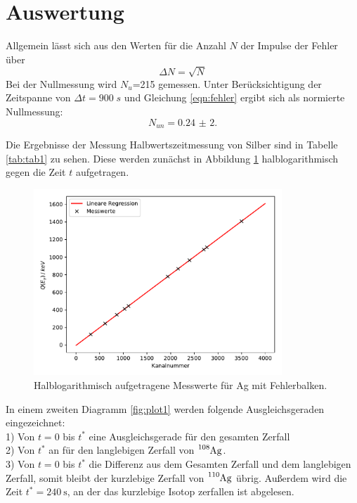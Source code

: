 \section{Auswertung}
\label{sec:Auswertung}
Allgemein lässt sich aus den Werten für die Anzahl $N$ der Impulse der Fehler
über
\begin{equation}
  \Delta N= \sqrt{N}
  \label{eqn:fehler}
\end{equation}
Bei der Nullmessung wird $N_u$=215 gemessen. Unter Berücksichtigung der Zeitspanne von
$\Delta t=900\;s$ und Gleichung \ref{eqn:fehler} ergibt sich als normierte Nullmessung:
\begin{equation}
  N_{un}=\SI{0,24(2)}.
\end{equation}

Die Ergebnisse der Messung Halbwertszeitmessung von Silber sind in Tabelle
\ref{tab:tab1} zu sehen. Diese werden zunächst in Abbildung \ref{fig:plot3}
halblogarithmisch gegen die Zeit $t$ aufgetragen.



\begin{figure}[H]
  \centering
  \includegraphics[height=7cm]{plot3.pdf}
  \caption{Halblogarithmisch aufgetragene Messwerte für Ag mit Fehlerbalken.}
  \label{fig:plot3}
\end{figure}

In einem zweiten Diagramm \ref{fig:plot1} werden folgende Ausgleichsgeraden eingezeichnet:\\
1) Von $t=0$ bis $t^{*}$ eine Ausgleichsgerade für den gesamten Zerfall\\
2) Von $t^{*}$ an für den langlebigen Zerfall von $\ce{^{108}Ag}$. \\
3) Von $t=0$ bis $t^{*}$ die Differenz aus dem Gesamten Zerfall und dem langlebigen Zerfall, somit
bleibt der kurzlebige Zerfall von $\ce{^{110}Ag}$ übrig.
Außerdem wird die Zeit $t^{*}=\SI{240}{\s}$, an der das kurzlebige Isotop zerfallen ist abgelesen.

